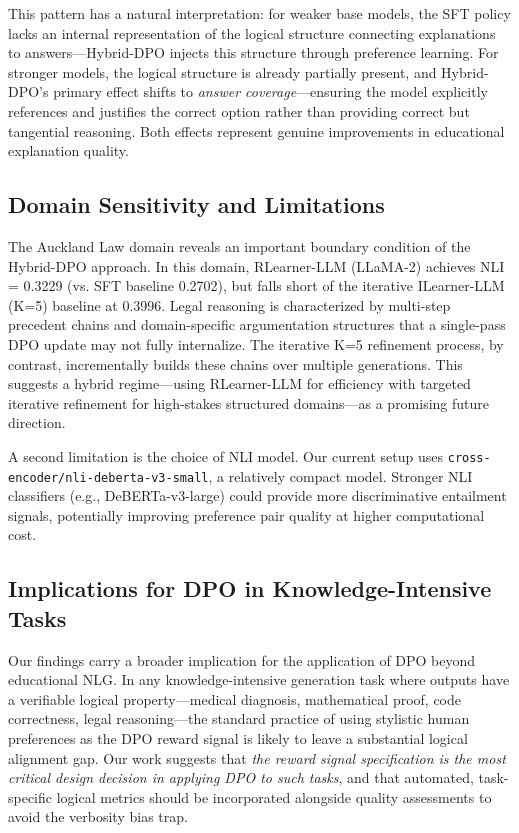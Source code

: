 This pattern has a natural interpretation: for weaker base models, the SFT policy lacks an internal representation of the logical structure connecting explanations to answers---Hybrid-DPO injects this structure through preference learning. For stronger models, the logical structure is already partially present, and Hybrid-DPO's primary effect shifts to \textit{answer coverage}---ensuring the model explicitly references and justifies the correct option rather than providing correct but tangential reasoning. Both effects represent genuine improvements in educational explanation quality.

\subsection{Domain Sensitivity and Limitations}

The Auckland Law domain reveals an important boundary condition of the Hybrid-DPO approach. In this domain, RLearner-LLM (LLaMA-2) achieves NLI = 0.3229 (vs. SFT baseline 0.2702), but falls short of the iterative ILearner-LLM (K=5) baseline at 0.3996. Legal reasoning is characterized by multi-step precedent chains and domain-specific argumentation structures that a single-pass DPO update may not fully internalize. The iterative K=5 refinement process, by contrast, incrementally builds these chains over multiple generations. This suggests a hybrid regime---using RLearner-LLM for efficiency with targeted iterative refinement for high-stakes structured domains---as a promising future direction.

A second limitation is the choice of NLI model. Our current setup uses \texttt{cross-encoder/nli-deberta-v3-small}, a relatively compact model. Stronger NLI classifiers (e.g., DeBERTa-v3-large) could provide more discriminative entailment signals, potentially improving preference pair quality at higher computational cost.

\subsection{Implications for DPO in Knowledge-Intensive Tasks}

Our findings carry a broader implication for the application of DPO beyond educational NLG. In any knowledge-intensive generation task where outputs have a verifiable logical property---medical diagnosis, mathematical proof, code correctness, legal reasoning---the standard practice of using stylistic human preferences as the DPO reward signal is likely to leave a substantial logical alignment gap. Our work suggests that \textit{the reward signal specification is the most critical design decision in applying DPO to such tasks}, and that automated, task-specific logical metrics should be incorporated alongside quality assessments to avoid the verbosity bias trap.

